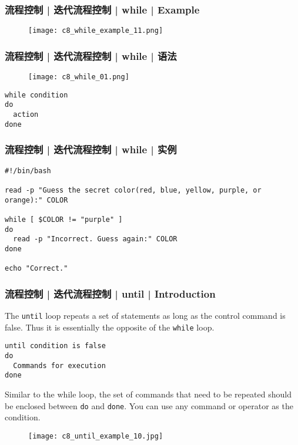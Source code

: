\begin{frame}
  \frametitle{流程控制 | 迭代流程控制 | while | Example}
  \begin{figure}
    \centering
    \texttt{[image: c8\_while\_example\_11.png]}
  \end{figure}
\end{frame}

\begin{frame}[fragile]
  \frametitle{流程控制 | 迭代流程控制 | while | \alert{语法}}
  \begin{figure}
    \centering
    \texttt{[image: c8\_while\_01.png]}
  \end{figure}
\begin{lstlisting}
while condition
do
  action
done
\end{lstlisting}
\end{frame}

\begin{frame}[fragile]
  \frametitle{流程控制 | 迭代流程控制 | while | \alert{实例}}
\begin{lstlisting}
#!/bin/bash

read -p "Guess the secret color(red, blue, yellow, purple, or orange):" COLOR

while [ $COLOR != "purple" ]
do
  read -p "Incorrect. Guess again:" COLOR
done

echo "Correct."
\end{lstlisting}
\end{frame}

\begin{frame}[fragile]
  \frametitle{流程控制 | 迭代流程控制 | until | Introduction}
  The \verb|until| loop repeats a set of statements as long as the control command is false. Thus it is essentially the opposite of the \verb|while| loop.\\
  \vspace{-0.2cm}
\begin{lstlisting}
until condition is false
do
  Commands for execution
done
\end{lstlisting}
  \vspace{-0.1cm}
  Similar to the while loop, the set of commands that need to be repeated should be enclosed between \verb|do| and \verb|done|. You can use any command or operator as the condition.\\
  \vspace{-0.2cm}
  \begin{figure}
    \centering
    \texttt{[image: c8\_until\_example\_10.jpg]}
  \end{figure}
\end{frame}

